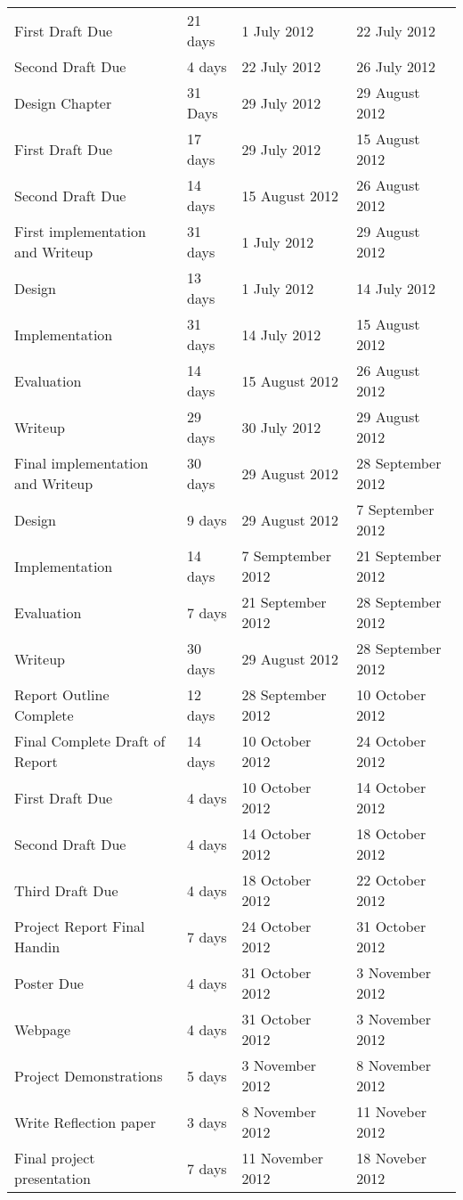 \documentclass[12pt,a4paper]{article}
\begin{document}
\begin{tabular}{l||l|l|l}
    \indent First Draft Due & 21 days & 1 July 2012 & 22 July 2012 \\
    \indent Second Draft Due & 4 days  & 22 July 2012 & 26 July 2012 \\
    \hline
    Design Chapter & 31 Days & 29 July 2012 & 29 August 2012 \\
    \indent First Draft Due & 17 days  & 29 July 2012 & 15 August 2012 \\
    \indent Second Draft Due & 14 days & 15 August 2012  & 26 August 2012 \\
    \hline
    First implementation and Writeup & 31 days & 1 July 2012 & 29 August 2012 \\
    \indent Design & 13 days & 1 July 2012 & 14 July 2012 \\
    \indent Implementation & 31 days & 14 July 2012 & 15 August 2012 \\
    \indent Evaluation & 14 days & 15 August 2012 & 26 August 2012  \\
    \indent Writeup & 29 days & 30 July 2012 & 29 August 2012 \\
    \hline
    Final implementation and Writeup & 30 days & 29 August 2012 & 28 September 2012 \\
    \indent Design & 9 days   & 29 August 2012  & 7 September 2012 \\
    \indent Implementation & 14 days & 7 Semptember 2012 & 21 September 2012 \\
    \indent Evaluation & 7 days & 21 September 2012  & 28 September 2012 \\
    \indent Writeup & 30 days & 29 August 2012 & 28 September 2012 \\
    \hline
    Report Outline Complete & 12 days  &28 September 2012 & 10 October 2012 \\
    \hline
    Final Complete Draft of Report & 14 days & 10 October 2012 & 24 October 2012 \\
    \indent First Draft Due & 4 days &10 October 2012 & 14 October 2012 \\
    \indent Second Draft Due & 4 days &14 October 2012 & 18 October 2012 \\
    \indent Third Draft Due & 4 days  &18 October 2012 & 22 October 2012 \\
    \hline
    Project Report Final Handin & 7 days & 24 October 2012 & 31 October 2012 \\
    \hline
    Poster Due & 4 days  & 31 October 2012 & 3 November 2012 \\
    \hline
    Webpage & 4 days & 31 October 2012 & 3 November 2012 \\
    \hline
    Project Demonstrations & 5 days & 3 November 2012 & 8 November 2012 \\
    \hline
    Write Reflection paper &3 days & 8 November 2012 & 11 Noveber 2012 \\
    \hline
    Final project presentation & 7 days &11 November 2012 & 18 Noveber 2012 \\

\end{tabular}
\end{document}
